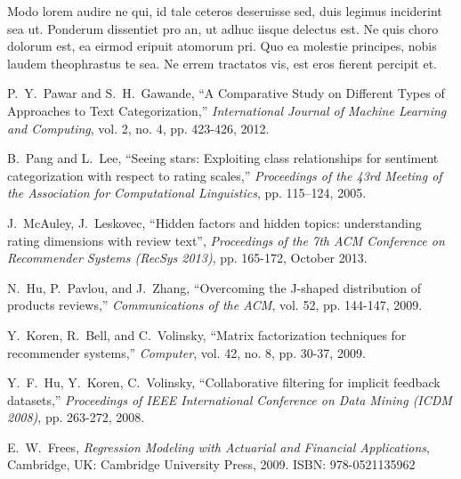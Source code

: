 \documentclass[a4paper]{article}
\begin{document}
Modo lorem audire ne qui, id tale ceteros deseruisse sed, duis legimus inciderint sea ut. Ponderum dissentiet pro an, ut adhuc iisque delectus est. Ne quis choro dolorum est, ea eirmod eripuit atomorum pri. Quo ea molestie principes, nobis laudem theophrastus te sea. Ne errem tractatos vis, est eros fierent percipit et.

\newpage
\begin{thebibliography}{00}
	
	
	P.~Y.~Pawar and S.~H.~Gawande, ``A Comparative Study on Different Types of Approaches to Text Categorization,'' \textit{International Journal of Machine Learning and Computing}, vol. 2, no. 4, pp. 423-426, 2012.
	
	B.~Pang and L.~Lee, ``Seeing stars: Exploiting class relationships for sentiment categorization with respect to rating scales,'' \textit{Proceedings of the 43rd Meeting of the Association for Computational Linguistics}, pp. 115–124, 2005.
	
	J.~McAuley, J.~Leskovec, ``Hidden factors and hidden topics: understanding rating dimensions with review text'', \textit{Proceedings of the 7th ACM Conference on Recommender Systems (RecSys 2013)}, pp. 165-172, October 2013.
	
	N.~Hu, P.~Pavlou, and J.~Zhang, ``Overcoming the J-shaped distribution of products reviews,'' \textit{Communications of the ACM}, vol. 52, pp. 144-147, 2009. 
	
	Y.~Koren, R.~Bell, and C.~Volinsky, ``Matrix factorization techniques for recommender systems,'' \textit{Computer}, vol. 42, no. 8, pp. 30-37, 2009.
	
	Y.~F.~Hu, Y.~Koren, C.~Volinsky, ``Collaborative filtering for implicit feedback datasets,'' \textit{Proceedings of IEEE International Conference on Data Mining (ICDM 2008)}, pp. 263-272, 2008.
	
	E.~W.~Frees, \textit{Regression Modeling with Actuarial and Financial Applications}, Cambridge, UK: Cambridge University Press, 2009. ISBN: 978-0521135962
	
\end{thebibliography}


\addtocounter{page}{-1}
\thispagestyle{empty}


\newpage
\appendix
\addtocounter{page}{-1}
\thispagestyle{empty}
\end{document}
